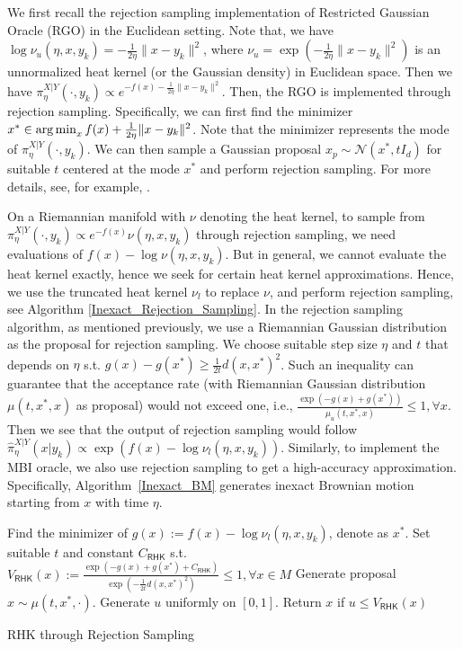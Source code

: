 We first recall the rejection sampling implementation of Restricted Gaussian Oracle (RGO) in the Euclidean setting. Note that, we have $\log \nu_{u}(\eta, x, y_{k}) = -\frac{1}{2\eta} \|x - y_{k}\|^{2}$, 
where $\nu_{u} = \exp(-\frac{1}{2\eta} \|x - y_{k}\|^{2})$ is an unnormalized heat kernel (or the Gaussian density) in Euclidean space. 
Then we have $\pi_{\eta}^{X|Y}(\cdot, y_{k}) \propto e^{-f(x) - \frac{1}{2\eta} \|x - y_{k}\|^{2}} $. 
Then, the RGO is implemented through rejection sampling. Specifically, we can first find the minimizer 
$ x^{*} \in \operatorname*{arg\,min}_{x} f(x) + \frac{1}{2\eta} \|x - y_{k}\|^{2} $. 
Note that the minimizer represents the mode of $\pi_{\eta}^{X|Y}(\cdot, y_{k})$.
We can then sample a Gaussian proposal $x_{p} \sim \mathcal{N}(x^{*}, t I_{d})$ 
for suitable $t$ centered at the mode $x^{*}$ and perform rejection sampling.
For more details, see, for example, \cite{chewi2023log}.

On a Riemannian manifold with $\nu$ denoting the heat kernel, to sample from $\pi_{\eta}^{X|Y}(\cdot, y_{k}) \propto e^{-f(x)} \nu(\eta, x, y_{k})$ through rejection sampling, we need evaluations of $f(x) - \log \nu(\eta, x, y_{k}) $. But in general, we cannot evaluate the heat kernel exactly, hence we seek for certain heat kernel approximations. Hence, we use the truncated heat kernel $\nu_{l}$ to replace $\nu$, 
and perform rejection sampling, see Algorithm \ref{Inexact_Rejection_Sampling}.
In the rejection sampling algorithm, as mentioned previously, we use a Riemannian Gaussian distribution as the proposal for rejection sampling. 
We choose suitable step size $\eta$ and $t$ that depends on $\eta$ s.t. $g(x) - g(x^{*}) \ge \frac{1}{2t}d(x, x^{*})^{2}$. 
Such an inequality can guarantee that the acceptance rate (with Riemannian Gaussian distribution $\mu(t, x^{*}, x)$ as proposal) would not exceed one, i.e., $\frac{\exp(-g(x) + g(x^{*}))}{\mu_{u}(t, x^{*}, x)} \le 1, \forall x$. Then we see that the output of rejection sampling would follow $\hat{\pi}_{\eta}^{X|Y}(x|y_{k}) \propto \exp(f(x) - \log \nu_{l}(\eta, x, y_{k})) $. Similarly, to implement the MBI oracle, we also use rejection sampling to get a high-accuracy approximation. Specifically, Algorithm~\ref{Inexact_BM} generates inexact Brownian motion starting from $x$ with time $\eta$.

\begin{algorithm}[t]
    \begin{algorithmic}
    \STATE Find the minimizer of $g(x) := f(x) - \log \nu_{l}(\eta, x, y_{k})$, denote as $x^{*}$.
    \STATE Set suitable $t$ and constant $C_{\mathsf{RHK}}$ s.t. $V_{\mathsf{RHK}}(x) := \frac{\exp(-g(x) + g(x^{*}) + C_{\mathsf{RHK}})}{\exp(-\frac{1}{2t} d(x, x^{*})^{2})} \le 1, \forall x \in M$
    \STATE Generate proposal $x \sim \mu(t, x^{*}, \cdot)$.
    \STATE Generate $u$ uniformly on $[0, 1]$. 
    \STATE Return $x$ if $u \le V_{\mathsf{RHK}}(x)$
    \ENDFOR
    \end{algorithmic}
    \caption{RHK through Rejection Sampling}
    \label{Inexact_Rejection_Sampling} 
\end{algorithm}



